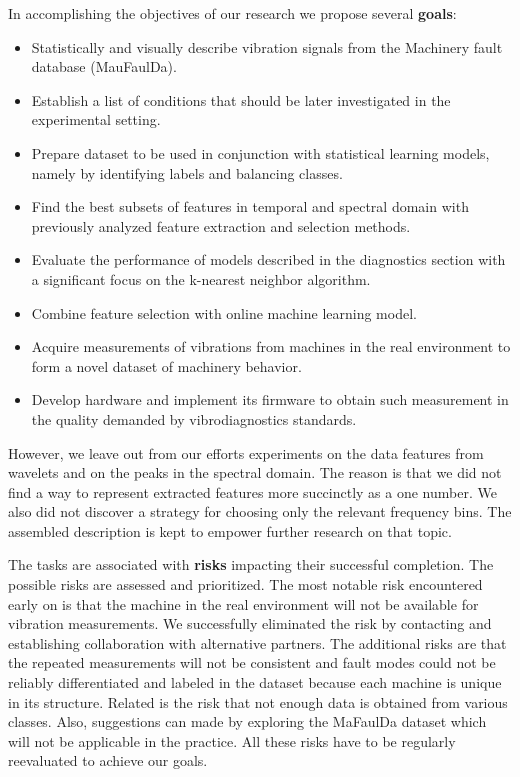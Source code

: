 \noindent In accomplishing the objectives of our research we propose several \textbf{goals}:
\begin{itemize}
    \itemsep0pt
	\item Statistically and visually describe vibration signals from the Machinery fault database (MauFaulDa).
	\item Establish a list of conditions that should be later investigated in the experimental setting.
	\item Prepare dataset to be used in conjunction with statistical learning models, namely by identifying labels and balancing classes.
	\item Find the best subsets of features in temporal and spectral domain with previously analyzed feature extraction and selection methods.
	\item Evaluate the performance of models described in the diagnostics section with a significant focus on the k-nearest neighbor algorithm.
	\item Combine feature selection with online machine learning model.
	\item Acquire measurements of vibrations from machines in the real environment to form a novel dataset of machinery behavior.
	\item Develop hardware and implement its firmware to obtain such measurement in the quality demanded by vibrodiagnostics standards.
\end{itemize}

However, we leave out from our efforts experiments on the data features from wavelets and on the peaks in the spectral domain. The reason is that we did not find a way to represent extracted features more succinctly as a one number. We also did not discover a strategy for choosing only the relevant frequency bins. The assembled description is kept to empower further research on that topic.

The tasks are associated with \textbf{risks} impacting their successful completion. The possible risks are assessed and prioritized. The most notable risk encountered early on is that the machine in the real environment will not be available for vibration measurements. We successfully eliminated the risk by contacting and establishing collaboration with alternative partners. The additional risks are that the repeated measurements will not be consistent and fault modes could not be reliably differentiated and labeled in the dataset because each machine is unique in its structure. Related is the risk that not enough data is obtained from various classes.  Also, suggestions can made by exploring the MaFaulDa dataset which will not be applicable in the practice. All these risks have to be regularly reevaluated to achieve our goals.

